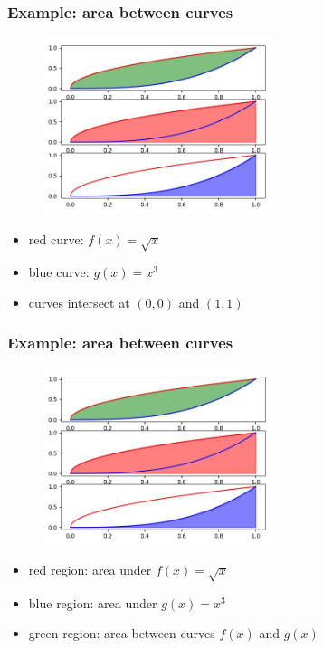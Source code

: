 \documentclass[english,14pt]{beamer}
\newcommand\red[1]{{\color{red} #1}}
\newcommand\blue[1]{{\color{blue} #1}}
\newcommand\darkGreen[1]{{\color{darkGreen} #1}}
\begin{document}
\begin{frame}[fragile]

\frametitle{Example: area between curves}

\begin{figure}[ht]
	\centering
	\includegraphics[width=0.6\textwidth]{figures/areabetweenfgexample}
\end{figure}

\vspace*{-3mm}
\begin{itemize}
	\item[] \red{red curve:} $f(x) = \sqrt{x}$
	\item[] \blue{blue curve:} $g(x) = x^3$
	\item[] curves intersect at $(0,0)$ and $(1,1)$
\end{itemize}

\end{frame}


\begin{frame}[fragile]

\frametitle{Example: area between curves}

\begin{figure}[ht]
	\centering
	\includegraphics[width=0.6\textwidth]{figures/areabetweenfgexample}
\end{figure}

\vspace*{-3mm}
\begin{itemize}
	\item[] \red{red region:} area under $f(x) = \sqrt{x}$ %
	\item[] \blue{blue region:} area under $g(x) = x^3$ %
	\item[] \darkGreen{green region:} area between curves $f(x)$ and $g(x)$
\end{itemize}

\end{frame}
\end{document}
